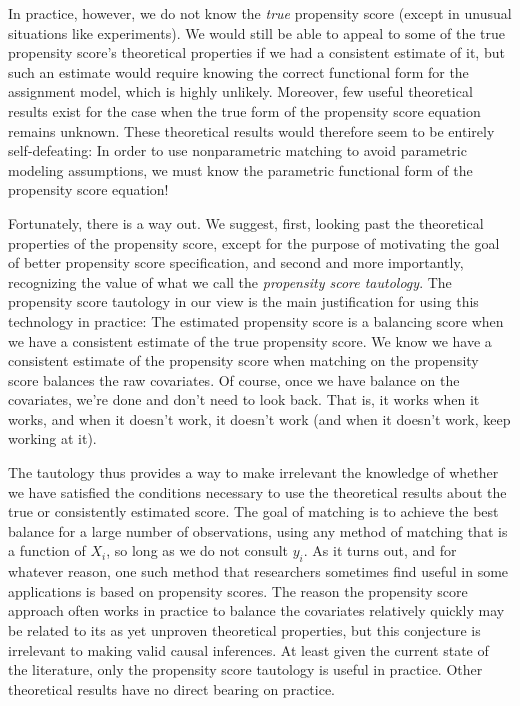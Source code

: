 \documentclass[11pt,titlepage]{article}
\begin{document}
In practice, however, we do not know the \emph{true} propensity score
(except in unusual situations like experiments).  We would still be
able to appeal to some of the true propensity score's theoretical
properties if we had a consistent estimate of it, but such an estimate
would require knowing the correct functional form for the assignment
model, which is highly unlikely.  Moreover, few useful theoretical
results exist for the case when the true form of the propensity score
equation remains unknown.  These theoretical results would therefore
seem to be entirely self-defeating: In order to use nonparametric
matching to avoid parametric modeling assumptions, we must know the
parametric functional form of the propensity score equation!

Fortunately, there is a way out.  We suggest, first, looking past the
theoretical properties of the propensity score, except for the purpose
of motivating the goal of better propensity score specification, and
second and more importantly, recognizing the value of what we call the
\emph{propensity score tautology}.  The propensity score tautology in
our view is the main justification for using this technology in
practice: The estimated propensity score is a balancing score when we
have a consistent estimate of the true propensity score.  We know we
have a consistent estimate of the propensity score when matching on
the propensity score balances the raw covariates.  Of course, once we
have balance on the covariates, we're done and don't need to look
back.  That is, it works when it works, and when it doesn't work, it
doesn't work (and when it doesn't work, keep working at it).

The tautology thus provides a way to make irrelevant the knowledge of
whether we have satisfied the conditions necessary to use the
theoretical results about the true or consistently estimated score.
The goal of matching is to achieve the best balance for a large number
of observations, using any method of matching that is a function of
$X_i$, so long as we do not consult $y_i$.  As it turns out, and for
whatever reason, one such method that researchers sometimes find
useful in some applications is based on propensity scores.  The reason
the propensity score approach often works in practice to balance the
covariates relatively quickly may be related to its as yet unproven
theoretical properties, but this conjecture is irrelevant to making
valid causal inferences.  At least given the current state of the
literature, only the propensity score tautology is useful in practice.
Other theoretical results have no direct bearing on practice.
\end{document}
